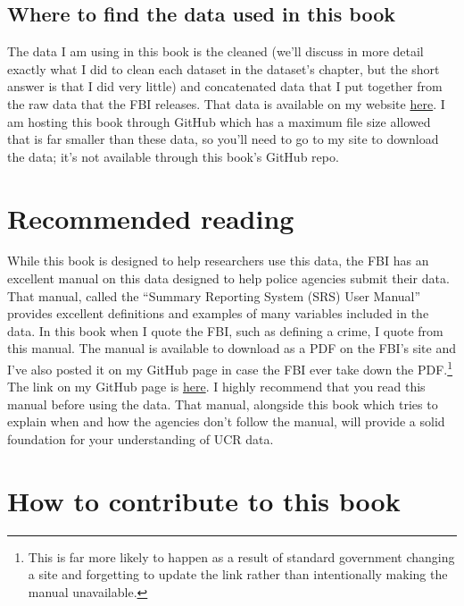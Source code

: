 \documentclass[
  12pt,
  openany]{book}
\begin{document}
\hypertarget{where-to-find-the-data-used-in-this-book}{%
\subsection{Where to find the data used in this book}\label{where-to-find-the-data-used-in-this-book}}

The data I am using in this book is the cleaned (we'll discuss in more detail exactly what I did to clean each dataset in the dataset's chapter, but the short answer is that I did very little) and concatenated data that I put together from the raw data that the FBI releases. That data is available on my website \href{https://jacobdkaplan.com/data.html}{here}. I am hosting this book through GitHub which has a maximum file size allowed that is far smaller than these data, so you'll need to go to my site to download the data; it's not available through this book's GitHub repo.

\hypertarget{recommended-reading}{%
\section{Recommended reading}\label{recommended-reading}}

While this book is designed to help researchers use this data, the FBI has an excellent manual on this data designed to help police agencies submit their data. That manual, called the ``Summary Reporting System (SRS) User Manual'' provides excellent definitions and examples of many variables included in the data. In this book when I quote the FBI, such as defining a crime, I quote from this manual. The manual is available to download as a PDF on the FBI's site and I've also posted it on my GitHub page in case the FBI ever take down the PDF.\footnote{This is far more likely to happen as a result of standard government changing a site and forgetting to update the link rather than intentionally making the manual unavailable.} The link on my GitHub page is \href{https://github.com/jacobkap/ucrbook/blob/main/FBI\%20Uniform\%20Crime\%20Reporting\%20(UCR)\%20Program\%20User\%20Manual.pdf}{here}. I highly recommend that you read this manual before using the data. That manual, alongside this book which tries to explain when and how the agencies don't follow the manual, will provide a solid foundation for your understanding of UCR data.

\hypertarget{how-to-contribute-to-this-book}{%
\section{How to contribute to this book}\label{how-to-contribute-to-this-book}}
\end{document}
